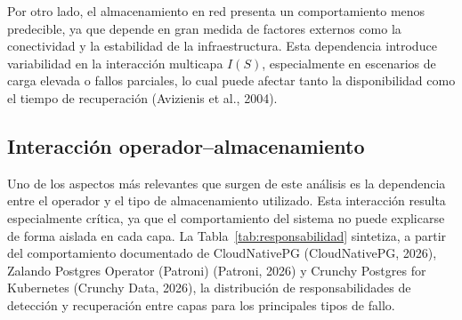 \documentclass[12pt,twocolumn,letterpaper]{article}
\begin{document}
Por otro lado, el almacenamiento en red presenta un comportamiento menos predecible, ya que depende en gran medida de factores externos como la conectividad y la estabilidad de la infraestructura. Esta dependencia introduce variabilidad en la interacción multicapa $I(S)$, especialmente en escenarios de carga elevada o fallos parciales, lo cual puede afectar tanto la disponibilidad como el tiempo de recuperación (Avizienis et al., 2004).

\subsection{Interacción operador--almacenamiento}
Uno de los aspectos más relevantes que surgen de este análisis es la dependencia entre el operador y el tipo de almacenamiento utilizado. Esta interacción resulta especialmente crítica, ya que el comportamiento del sistema no puede explicarse de forma aislada en cada capa. La Tabla~\ref{tab:responsabilidad} sintetiza, a partir del comportamiento documentado de CloudNativePG (CloudNativePG, 2026), Zalando Postgres Operator (Patroni) (Patroni, 2026) y Crunchy Postgres for Kubernetes (Crunchy Data, 2026), la distribución de responsabilidades de detección y recuperación entre capas para los principales tipos de fallo.
\end{document}
